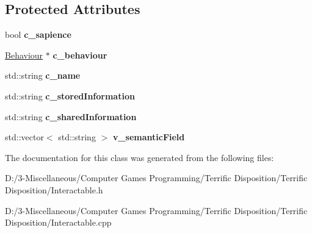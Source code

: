 \subsection*{Protected Attributes}
\begin{DoxyCompactItemize}
\item 
\mbox{\label{class_interactable_a5d9f37cef3286521bc66bb6500dc900b}} 
bool {\bfseries c\+\_\+sapience}
\item 
\mbox{\label{class_interactable_a50d6718960039f2e9861930c1be1f2ff}} 
\hyperlink{class_behaviour}{Behaviour} $\ast$ {\bfseries c\+\_\+behaviour}
\item 
\mbox{\label{class_interactable_acc575b4d239cd37c620537c692bf6c09}} 
std\+::string {\bfseries c\+\_\+name}
\item 
\mbox{\label{class_interactable_a29b8926350126a63fe9320dcb00fcb90}} 
std\+::string {\bfseries c\+\_\+stored\+Information}
\item 
\mbox{\label{class_interactable_af1c2f5b875e7e247fad1f657b8df7a3b}} 
std\+::string {\bfseries c\+\_\+shared\+Information}
\item 
\mbox{\label{class_interactable_a6b909da06b3e841757c924cf9ae485f4}} 
std\+::vector$<$ std\+::string $>$ {\bfseries v\+\_\+semantic\+Field}
\end{DoxyCompactItemize}


The documentation for this class was generated from the following files\+:\begin{DoxyCompactItemize}
\item 
D\+:/3-\/\+Miscellaneous/\+Computer Games Programming/\+Terrific Disposition/\+Terrific Disposition/Interactable.\+h\item 
D\+:/3-\/\+Miscellaneous/\+Computer Games Programming/\+Terrific Disposition/\+Terrific Disposition/Interactable.\+cpp\end{DoxyCompactItemize}
